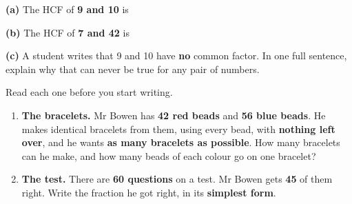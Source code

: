 \documentclass[12pt,a4paper]{article}
\begin{document}
\noindent\textbf{(a)} The HCF of \textbf{9 and 10} is \blank[3cm]

\vspace{6pt}
\noindent\textbf{(b)} The HCF of \textbf{7 and 42} is \blank[3cm]

\vspace{8pt}
\noindent\textbf{(c)} A student writes that 9 and 10 have \textbf{no} common factor.
In one full sentence, explain why that can never be true for any pair of numbers.


\noindent Read each one  before you start writing.

\begin{enumerate}[label=\textbf{\arabic*.}, itemsep=14pt]

  \item \textbf{The bracelets.} Mr Bowen has \textbf{42 red beads} and
        \textbf{56 blue beads}. He makes identical bracelets from them, using every
        bead, with \textbf{nothing left over}, and he wants \textbf{as many
        bracelets as possible}. How many bracelets can he make, and how many beads
        of each colour go on one bracelet?
        \begin{workspace}[2.7cm]\end{workspace}

  \item \textbf{The test.} There are \textbf{60 questions} on a test. Mr Bowen gets
        \textbf{45} of them right. Write the fraction he got right, in its
        \textbf{simplest form}.
        \begin{workspace}[2.4cm]\end{workspace}

\end{enumerate}

\end{document}
